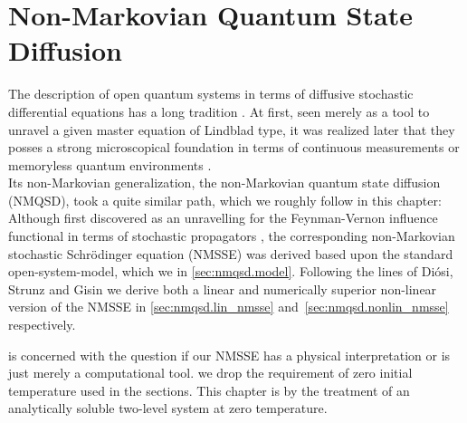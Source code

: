 \chapter{Non-Markovian Quantum State Diffusion}
\label{chap:nmqsd}
%
%

The description of open quantum systems in terms of diffusive stochastic differential equations has a long tradition \cite{}.
At first, seen merely as a tool to unravel a given master equation of Lindblad type, it was realized later that they posses a strong microscopical foundation in terms of continuous measurements or memoryless quantum environments \cite{}.\\




Its non-Markovian generalization, the non-Markovian quantum state diffusion (NMQSD), took a quite similar path, which we roughly follow in this chapter:
Although first discovered as an unravelling for the Feynman-Vernon influence functional in terms of stochastic propagators \cite{St96_lin_nmqsd}, the corresponding non-Markovian stochastic Schrödinger equation (NMSSE) was derived based upon the standard open-system-model, which we  in \autoref{sec:nmqsd.model}.
Following the lines of Diósi, Strunz and Gisin \cite{DiSt97_nmsse,DiGiSt98_nmqsd,StDiGi99_nmq_traj} we derive both a linear and numerically superior non-linear version of the NMSSE in \autoref{sec:nmqsd.lin_nmsse} and~\ref{sec:nmqsd.nonlin_nmsse} respectively.

%

 is concerned with the question if our NMSSE has a physical interpretation or is just merely a computational tool.
 we drop the requirement of zero initial temperature used in the  sections.
This chapter is  by the treatment of an analytically soluble two-level system at zero temperature.\\

